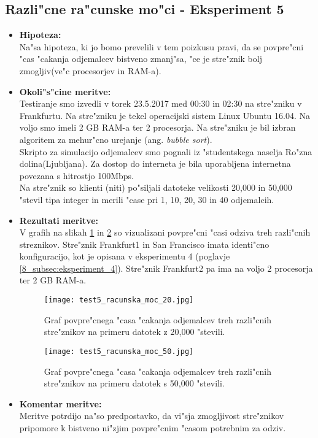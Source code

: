 \subsection{Razli"cne ra"cunske mo"ci - Eksperiment 5}
\begin{itemize}
	\item \textbf{Hipoteza: }  \\
		Na"sa hipoteza, ki jo bomo prevelili v tem poizkusu pravi, da se povpre"cni "cas "cakanja odjemalcev bistveno zmanj"sa, "ce je stre"znik bolj zmogljiv(ve"c procesorjev in RAM-a).

	\item \textbf{Okoli"s"cine meritve: } \\
		Testiranje smo izvedli v torek 23.5.2017 med 00:30 in 02:30 na stre"zniku v Frankfurtu. Na stre"zniku je tekel operacijski sistem Linux Ubuntu 16.04. Na voljo smo imeli 2 GB RAM-a ter 2 procesorja. Na stre"zniku je bil izbran algoritem za mehur"cno urejanje (ang. \textit{bubble sort}).\\ Skripto za simulacijo odjemalcev smo pognali iz "studentskega naselja Ro"zna dolina(Ljubljana). Za dostop do interneta je bila uporabljena internetna povezana s hitrostjo 100Mbps.\\ Na stre"znik so klienti (niti) po"siljali datoteke velikosti 20,000 in 50,000 "stevil tipa integer in merili "case pri 1, 10, 20, 30 in 40 odjemalcih.

 	\item \textbf{Rezultati meritve: }  \\

		V grafih na slikah \ref{8_graf_racunska_moc_20} in \ref{8_graf_racunska_moc_50} so vizualizani povpre"cni "casi odziva treh razli"cnih streznikov. Stre"znik Frankfurt1 in San Francisco imata identi"cno konfiguracijo, kot je opisana v eksperimentu 4 (poglavje \ref{8_subsec:eksperiment_4}). Stre"znik Frankfurt2 pa ima na voljo 2 procesorja ter 2 GB RAM-a.

		\begin{figure}[h]
  		\centering
  		  \texttt{[image: test5\_racunska\_moc\_20.jpg]}
  		\caption{Graf povpre"cnega "casa "cakanja odjemalcev treh razli"cnih stre"znikov na primeru datotek z 20,000 "stevili.}
  		\label{8_graf_racunska_moc_20}
		\end{figure}

	\begin{figure}[h]
  		\centering
  		  \texttt{[image: test5\_racunska\_moc\_50.jpg]}
  		\caption{Graf povpre"cnega "casa "cakanja odjemalcev treh razli"cnih stre"znikov na primeru datotek s 50,000 "stevili.}
  		\label{8_graf_racunska_moc_50}
		\end{figure}
	\item \textbf{Komentar meritve: } \\
		Meritve potrdijo na"so predpostavko, da vi"sja zmogljivost stre"znikov pripomore k bistveno ni"zjim povpre"cnim "casom potrebnim za odziv.
\end{itemize}

